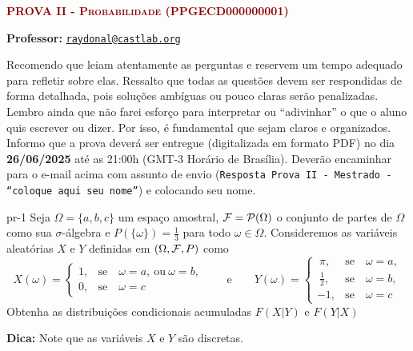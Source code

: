 




% 


{\scshape\bf\textcolor{darkred}{PROVA II - Probabilidade (PPGECD000000001)}}


\textsf{\textbf{Professor:}}    \href{mailto:raydonal@castlab.org}{\texttt{raydonal@castlab.org}}

\bigskip 
\begin{regras}
Recomendo que leiam atentamente as perguntas e reservem um tempo adequado para refletir sobre elas. Ressalto que todas as questões devem ser respondidas de forma detalhada, pois soluções ambíguas ou pouco claras serão penalizadas. Lembro ainda que não farei esforço para interpretar ou ``adivinhar'' o que o aluno quis escrever ou dizer. Por isso, é fundamental que sejam claros e organizados. Informo que a prova deverá ser entregue (digitalizada em formato PDF) no dia {\bf 26/06/2025} até as 21:00h (GMT-3 Horário de Brasília). Deverão encaminhar para o e-mail acima com assunto de envio ({\tt Resposta Prova II - Mestrado - ``coloque aqui seu  nome''})  e colocando seu nome.
\end{regras}
\vspace{2ex}


\begin{problema}{}{pr-1}
	Seja $\Omega = \{a, b, c\}$  um espaço amostral, ${\cal F}={\cal P}(\Omega)$ o conjunto de partes de $\Omega$ como sua $\sigma$-álgebra e $P(\{\omega\})=\frac{1}{3}$ para todo $\omega \in \Omega.$ Consideremos as variáveis aleatórias $X$ e $Y$ definidas em $(\Omega, {\cal F}, P)$ como
	$$
	X(\omega) =
	\begin{cases}
		1, &  \text{se}  \quad  \omega=a, \ \text{ou} \ \omega = b,  \\
		0, &  \text{se}  \quad  \omega=c
	\end{cases} 
	\qquad \text{e} \qquad 
	Y(\omega) =
	\begin{cases}
		\ \pi, &  \text{se}  \quad  \omega=a, \\
		\ \frac{1}{2}, &  \text{se}  \quad  \omega=b, \\
		-1, &  \text{se}  \quad  \omega=c
	\end{cases} 
	$$
	Obtenha as distribuições condicionais acumuladas $F(X|Y)$ e $F(Y|X)$  
	
	{\bf Dica:}  Note que as variáveis $X$ e $Y$ são discretas.
	
\end{problema}






